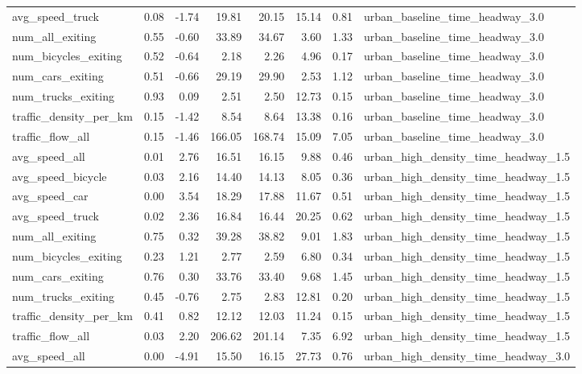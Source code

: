 \begin{table}[ht]
\begin{tabular}{lrrrrrrl}
  avg\_speed\_truck & 0.08 & -1.74 & 19.81 & 20.15 & 15.14 & 0.81 & urban\_baseline\_time\_headway\_3.0 \\ 
  num\_all\_exiting & 0.55 & -0.60 & 33.89 & 34.67 & 3.60 & 1.33 & urban\_baseline\_time\_headway\_3.0 \\ 
  num\_bicycles\_exiting & 0.52 & -0.64 & 2.18 & 2.26 & 4.96 & 0.17 & urban\_baseline\_time\_headway\_3.0 \\ 
  num\_cars\_exiting & 0.51 & -0.66 & 29.19 & 29.90 & 2.53 & 1.12 & urban\_baseline\_time\_headway\_3.0 \\ 
  num\_trucks\_exiting & 0.93 & 0.09 & 2.51 & 2.50 & 12.73 & 0.15 & urban\_baseline\_time\_headway\_3.0 \\ 
  traffic\_density\_per\_km & 0.15 & -1.42 & 8.54 & 8.64 & 13.38 & 0.16 & urban\_baseline\_time\_headway\_3.0 \\ 
  traffic\_flow\_all & 0.15 & -1.46 & 166.05 & 168.74 & 15.09 & 7.05 & urban\_baseline\_time\_headway\_3.0 \\ 
  avg\_speed\_all & 0.01 & 2.76 & 16.51 & 16.15 & 9.88 & 0.46 & urban\_high\_density\_time\_headway\_1.5 \\ 
  avg\_speed\_bicycle & 0.03 & 2.16 & 14.40 & 14.13 & 8.05 & 0.36 & urban\_high\_density\_time\_headway\_1.5 \\ 
  avg\_speed\_car & 0.00 & 3.54 & 18.29 & 17.88 & 11.67 & 0.51 & urban\_high\_density\_time\_headway\_1.5 \\ 
  avg\_speed\_truck & 0.02 & 2.36 & 16.84 & 16.44 & 20.25 & 0.62 & urban\_high\_density\_time\_headway\_1.5 \\ 
  num\_all\_exiting & 0.75 & 0.32 & 39.28 & 38.82 & 9.01 & 1.83 & urban\_high\_density\_time\_headway\_1.5 \\ 
  num\_bicycles\_exiting & 0.23 & 1.21 & 2.77 & 2.59 & 6.80 & 0.34 & urban\_high\_density\_time\_headway\_1.5 \\ 
  num\_cars\_exiting & 0.76 & 0.30 & 33.76 & 33.40 & 9.68 & 1.45 & urban\_high\_density\_time\_headway\_1.5 \\ 
  num\_trucks\_exiting & 0.45 & -0.76 & 2.75 & 2.83 & 12.81 & 0.20 & urban\_high\_density\_time\_headway\_1.5 \\ 
  traffic\_density\_per\_km & 0.41 & 0.82 & 12.12 & 12.03 & 11.24 & 0.15 & urban\_high\_density\_time\_headway\_1.5 \\ 
  traffic\_flow\_all & 0.03 & 2.20 & 206.62 & 201.14 & 7.35 & 6.92 & urban\_high\_density\_time\_headway\_1.5 \\ 
  avg\_speed\_all & 0.00 & -4.91 & 15.50 & 16.15 & 27.73 & 0.76 & urban\_high\_density\_time\_headway\_3.0 \\ 

\end{tabular}
\end{table}

